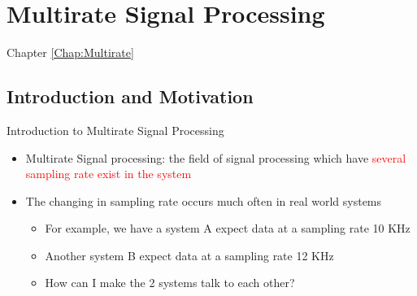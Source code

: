 \section{Multirate Signal Processing}
\label{Chap:Multirate}
\begin{frame}[t]{Chapter \autoref{Chap:Multirate}}
\tableofcontents[sections= \value{section}]
\end{frame}


\subsection{Introduction and Motivation}
\begin{frame}[t,allowframebreaks]{Introduction to Multirate Signal Processing}

\begin{itemize}

\item Multirate Signal processing: the field of signal processing which have \textcolor{red}{several sampling rate exist in the system} \cite{DSP_DimitrisManolakis}

\item The changing in sampling rate occurs much often in real world systems

    \begin{itemize}
        \item For example, we have a system A expect data at a sampling rate 10 KHz
        
        \item Another system B expect data at a sampling rate 12 KHz
        
        \item How can I make the 2 systems talk to each other?
        
    \end{itemize}

\end{itemize}


\end{frame}



